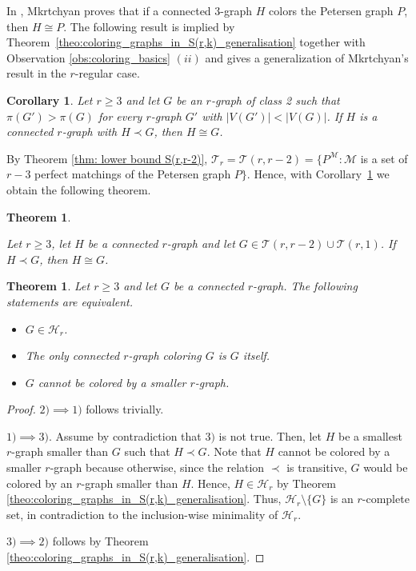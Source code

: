 \documentclass[a4paper,11pt]{article}
\newcommand{\ca}{\mathcal}
\newtheorem{theo}[defi]{Theorem}
\newtheorem{cor}[defi]{Corollary}
\theoremstyle{remark}
\begin{document}
In \cite{Mkrtchyan_Pet_col}, Mkrtchyan proves that if a connected $3$-graph $H$ colors the Petersen graph $P$, then $H\cong P$. The following result is implied by Theorem~\ref{theo:coloring_graphs_in_S(r,k)_generalisation} together with Observation \ref{obs:coloring_basics} $(ii)$ and  gives a generalization of Mkrtchyan's result in the $r$-regular case.

\begin{cor}
\label{cor:coloring_graphs_in_S(r,k)}
Let $r \geq 3$ and let $G$ be an $r$-graph of class 2 such that $\pi(G')>\pi(G)$ for every $r$-graph $G'$ with $|V(G')|<|V(G)|$. If $H$ is a connected $r$-graph with $H \prec G$, then $H \cong G$.
\end{cor}

 By Theorem \ref{thm: lower bound S(r,r-2)}, $\ca T_r = \ca T(r,r-2) =\{P^{\ca M}\colon \ca M $ is a set of $r-3$ perfect matchings of the Petersen graph $ P\}$.
Hence, with Corollary~\ref{cor:coloring_graphs_in_S(r,k)} we obtain the following theorem.

\begin{theo}
\label{theo:coloring_P^M}


Let $r\geq3$, let $H$ be a connected $r$-graph and let $G\in \ca T(r,r-2)\cup \ca T(r,1)$. If $H \prec G$, then $H \cong G$.
\end{theo}

\begin{theo}
\label{theo:characterisation H_r}
	Let $r\ge3$ and let $G$ be a connected $r$-graph. The following statements are equivalent.
	\begin{itemize}
		\item[1)] $G\in\ca H_r$.
		\item[2)] The only connected $r$-graph coloring $G$ is $G$ itself.
		\item[3)] $G$ cannot be colored by a smaller $r$-graph.
	\end{itemize}
\end{theo}

\begin{proof}
	$2) \implies 1)$ follows trivially.
	
	$1) \implies 3)$. Assume by contradiction that $3)$ is not true. Then, let $H$ be a smallest $r$-graph smaller than $G$ such that $H\prec G$. Note that $H$ cannot be colored by a smaller $r$-graph because otherwise, since the relation $\prec$ is transitive, $G$ would be colored by an $r$-graph smaller than $H$. Hence, $H\in \ca H_r$ by Theorem \ref{theo:coloring_graphs_in_S(r,k)_generalisation}. Thus, $\ca H_r \setminus \{G\}$ is an $r$-complete set, in contradiction to the inclusion-wise minimality of $\ca H_r$.
	
	$3) \implies 2)$ follows by Theorem \ref{theo:coloring_graphs_in_S(r,k)_generalisation}.
\end{proof}
\end{document}
